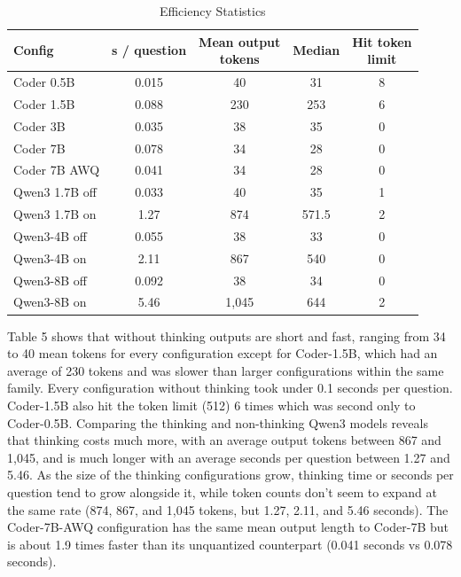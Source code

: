 \begin{table}[!htbp]
\centering
\caption{Efficiency Statistics}
\label{tab:5}
\small
\begin{adjustbox}{max width=\linewidth}
\begin{tabular}{@{}lcccc@{}}
\toprule
Config & s / question & \makecell{Mean output \\ {}tokens} & Median & \makecell{Hit token \\ {}limit} \\
\midrule
Coder 0.5B & 0.015 & 40 & 31 & 8 \\
Coder 1.5B & 0.088 & 230 & 253 & 6 \\
Coder 3B & 0.035 & 38 & 35 & 0 \\
Coder 7B & 0.078 & 34 & 28 & 0 \\
Coder 7B AWQ & 0.041 & 34 & 28 & 0 \\
Qwen3 1.7B off & 0.033 & 40 & 35 & 1 \\
Qwen3 1.7B on & 1.27 & 874 & 571.5 & 2 \\
Qwen3-4B off & 0.055 & 38 & 33 & 0 \\
Qwen3-4B on & 2.11 & 867 & 540 & 0 \\
Qwen3-8B off & 0.092 & 38 & 34 & 0 \\
Qwen3-8B on & 5.46 & 1,045 & 644 & 2 \\
\bottomrule
\end{tabular}
\end{adjustbox}
\par{}
\end{table}

Table 5 shows that without thinking outputs are short and fast, ranging from 34 to 40 mean tokens for every configuration except for Coder-1.5B, which had an average of 230 tokens and was slower than larger configurations within the same family. Every configuration without thinking took under 0.1 seconds per question. Coder-1.5B also hit the token limit (512) 6 times which was second only to Coder-0.5B. Comparing the thinking and non-thinking Qwen3 models reveals that thinking costs much more, with an average output tokens between 867 and 1,045, and is much longer with an average seconds per question between 1.27 and 5.46. As the size of the thinking configurations grow, thinking time or seconds per question tend to grow alongside it, while token counts don't seem to expand at the same rate (874, 867, and 1,045 tokens, but 1.27, 2.11, and 5.46 seconds). The Coder-7B-AWQ configuration has the same mean output length to Coder-7B but is about 1.9 times faster than its unquantized counterpart (0.041 seconds vs 0.078 seconds).

